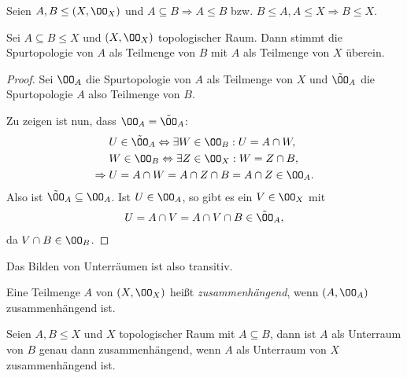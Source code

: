 \begin{lem}
\label{prop:2.2.6}
Seien $A,B\le (X,\OO_X)$ und $A\subseteq B\Rightarrow A\le B$ bzw. $B\le A,
A\le X \Rightarrow B\le X$.

Sei $A\subseteq B\le X$ und $(X,\OO_X)$ topologischer Raum. Dann stimmt die
Spurtopologie von $A$ als Teilmenge von $B$ mit $A$ als Teilmenge von $X$
überein.\fishhere
\end{lem}
\begin{proof}
Sei $\OO_A$ die Spurtopologie von $A$ als Teilmenge von $X$ und $\tilde{\OO}_A$
die Spurtopologie $A$ also Teilmenge von $B$.

Zu zeigen ist nun, dass $\OO_A = \tilde{\OO}_A$:
\begin{align*}
&U\in\tilde{\OO}_A\Leftrightarrow \exists W\in\OO_B : U = A\cap W,\\
&W\in\OO_B \Leftrightarrow \exists Z\in\OO_X : W = Z\cap B,\\
\Rightarrow\; &U = A\cap W = A\cap Z\cap B = A\cap Z\in \OO_A.
\end{align*}
Also ist $\tilde{\OO}_A \subseteq \OO_A$. Ist $U\in\OO_A$, so gibt es ein
$V\in\OO_X$ mit
\begin{align*}
U=A\cap V = A\cap V\cap B\in\tilde{\OO}_A,
\end{align*}
da $V\cap B\in\OO_B$.\qedhere
\end{proof}

Das Bilden von Unterräumen ist also transitiv.

\begin{defn}
\label{defn:2.2.7}
Eine Teilmenge $A$ von $(X,\OO_X)$ heißt
\emph{zusammenhängend}, wenn $(A,\OO_A)$ zusammenhängend ist.\fishhere
\end{defn}

\begin{cor}
\label{prop:2.2.8}
Seien $A,B\le X$ und $X$ topologischer Raum mit $A\subseteq B$, dann ist $A$
als Unterraum von $B$ genau dann zusammenhängend, wenn $A$ als Unterraum von
$X$ zusammenhängend ist.\fishhere
\end{cor}


